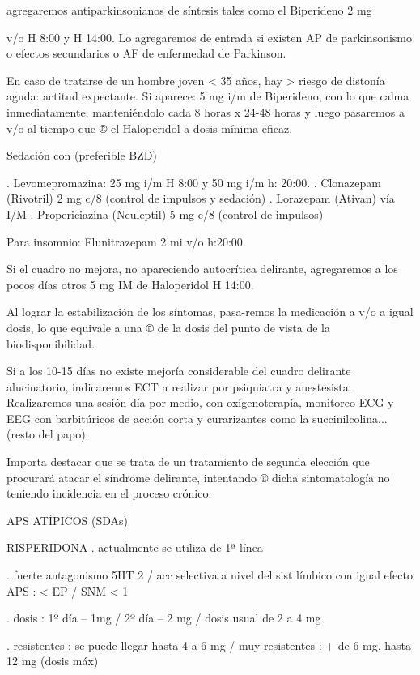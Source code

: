 agregaremos antiparkinsonianos de síntesis tales como el Biperideno 2 mg

v/o H 8:00 y H 14:00. Lo agregaremos de entrada si existen AP de parkinsonismo o efectos secundarios o AF de enfermedad de Parkinson.

En caso de tratarse de un hombre joven < 35 años, hay > riesgo de distonía aguda: actitud expectante. Si aparece: 5 mg i/m de Biperideno, con lo que calma inmediatamente, manteniéndolo cada 8 horas x 24-48 horas y luego pasaremos a v/o al tiempo que ® el Haloperidol a dosis mínima eficaz.

Sedación con (preferible BZD)

. Levomepromazina: 25 mg i/m H 8:00 y 50 mg i/m h: 20:00.
. Clonazepam (Rivotril) 2 mg c/8 (control de impulsos y sedación)
. Lorazepam (Ativan) vía I/M
. Propericiazina (Neuleptil) 5 mg c/8 (control de impulsos)

Para insomnio: Flunitrazepam 2 mi v/o h:20:00.

Si el cuadro no mejora, no apareciendo autocrítica delirante, agregaremos a los pocos días otros 5 mg IM de Haloperidol H 14:00.

Al lograr la estabilización de los síntomas, pasa-remos la medicación a v/o a igual dosis, lo que equivale a una ® de la dosis del punto de vista de la biodisponibilidad.

Si a los 10-15 días no existe mejoría considerable del cuadro delirante alucinatorio, indicaremos ECT a realizar por psiquiatra y anestesista. Realizaremos una sesión día por medio, con oxigenoterapia, monitoreo ECG y EEG con barbitúricos de acción corta y curarizantes como la succinilcolina... (resto del papo).

Importa destacar que se trata de un tratamiento de segunda elección que procurará atacar el síndrome delirante, intentando ® dicha sintomatología no teniendo incidencia en el proceso crónico.

APS ATÍPICOS (SDAs)

RISPERIDONA . actualmente se utiliza de 1ª línea

. fuerte antagonismo 5HT 2 / acc selectiva a nivel del sist límbico con igual efecto APS : < EP / SNM < 1%

. dosis : 1º día – 1mg / 2º día – 2 mg / dosis usual de 2 a 4 mg

. resistentes : se puede llegar hasta 4 a 6 mg / muy resistentes : + de 6 mg, hasta 12 mg (dosis máx)

